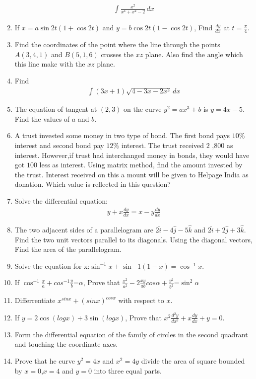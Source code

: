 \documentclass{article}
\begin{document}
\begin{enumerate}
	\begin{align*}
\int \frac{x^2}{x^4 + x^2 - 2} \, dx
		\end{align*}
\item If $x= a \sin 2t (1 + \cos 2t)$ and $y= b \cos 2t (1 - \cos 2t)$, Find $\frac{dy}{dx}$ at $ t = \frac{\pi}{4}$.
\item Find the coordinates of the point where the line through the points $ A(3,4,1) $ and $B(5,1,6)$ crosses the $xz$ plane. Also find the angle which this line make with the $xz$ plane.
\item Find \begin{align*}
		\int (3x+1)\sqrt {4-3x-2x^2} \, dx
\end{align*}
\item The equation of tangent at $(2,3)$ on the curve $y^2=ax^3+b$ is $y=4x-5$. Find the values of $a$ and $b$.
\item A trust invested some money in two type of bond. The first bond pays $10\%$ interest and second bond pay $12\%$ interest. The trust received \rupee $2$ ,$800$ as interest. However,if trust had interchanged money in bonds, they would have got \rupee $100$ less as interest. Using matrix method, find the amount invested by the trust. Interest received on this a mount will be given to Helpage India as donation. Which value is reflected in this question?
\item Solve the differential equation:
	\begin{align*}
		y + x \frac{dy}{dx} = x - y \frac{dy}{dx}
	\end{align*}
\item The two adjacent sides of a parallelogram are  $ 2\hat{i}-4\hat{j}-5\hat{k} $ and $2\hat{i}+2\hat{j}+3\hat{k} $. Find the two unit vectors parallel to its diagonals. Using the diagonal vectors, Find the area of the parallelogram.
\item Solve the equation for x:$\sin^{-1}x+\sin{^-1}(1-x) = \cos^{-1}x$.
 \item If $\cos^{-1}\frac{x}{a}+cos^{-1}\frac{y}{b}$=$\alpha$, Prove that $\frac{x^2}{a^2}-2\frac{xy}{ab}cos\alpha+\frac{y^2}{b^2}$=$\sin^2\alpha$
 \item Differrentiate $x^{sinx}+(sinx)^{cosx}$ with respect to $x$.
 \item If $ y=2\cos(logx)+3\sin(logx)$, Prove that $x^2\frac{d^2y}{dx^2}+x\frac{dy}{dx}+y=0$.
 \item Form the differential equation of the family of circles in the second quadrant and touching the coordinate axes.
 \item Prove that he curve $y^2=4x$ and $x^2=4y$ divide the area of square bounded by $x=0$,$x=4$ and $y=0$ into three equal parts.

\end{enumerate}
\end{document}
